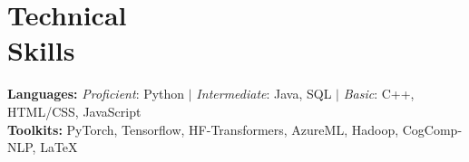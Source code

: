 \vspace{-0.1cm}    
\section{\mysidestyle Technical\\ Skills}
\textbf{Languages:} \textit{Proficient}: Python $|$ \textit{Intermediate}: Java, SQL $|$ \textit{Basic}: C++, HTML/CSS, JavaScript\\
\textbf{Toolkits:} PyTorch, Tensorflow, HF-Transformers, AzureML, Hadoop, CogComp-NLP, LaTeX